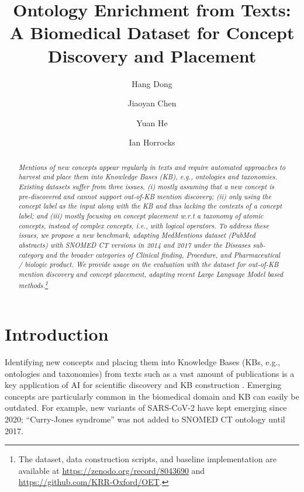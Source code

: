 \documentclass[sigconf]{acmart}
\begin{document}
\title{Ontology Enrichment from Texts: A Biomedical Dataset for Concept Discovery and Placement}

\author{Hang Dong}
	
	\author{Jiaoyan Chen}
	
	\author{Yuan He}
	
	\author{Ian Horrocks}
	
	\renewcommand{\shortauthors}{Dong et al.}
 
\begin{abstract}
\noindent\textit{Mentions of new concepts appear regularly in texts and require automated approaches to harvest and place them into Knowledge Bases (KB), e.g., ontologies and taxonomies. Existing datasets suffer from three issues, (i) mostly assuming that a new concept is pre-discovered and cannot support out-of-KB mention discovery; (ii) only using the concept label as the input along with the KB and thus lacking the contexts of a concept label; and (iii) mostly focusing on concept placement w.r.t a taxonomy of atomic concepts, instead of complex concepts, i.e., with logical operators. To address these issues, we propose a new benchmark, adapting MedMentions dataset (PubMed abstracts) with SNOMED CT versions in 2014 and 2017 under the Diseases sub-category and the broader categories of Clinical finding, Procedure, and Pharmaceutical / biologic product. We provide usage on the evaluation with the dataset for out-of-KB mention discovery and concept placement, adapting recent Large Language Model based methods.\footnote{The dataset, data construction scripts, and baseline implementation are available at \url{https://zenodo.org/record/8043690} and \url{https://github.com/KRR-Oxford/OET}.}}
\end{abstract}
\maketitle

\section{Introduction}
\label{sec:intro}
Identifying new concepts and placing them into Knowledge Bases (KBs, e.g., ontologies and taxonomies) from texts such as a vast amount of publications is a key application of AI for scientific discovery and KB construction \cite{hastings2023ai}. Emerging concepts are particularly common in the biomedical domain and KB can easily be outdated. For example, new variants of SARS-CoV-2 have kept emerging since 2020; ``Curry-Jones syndrome'' was not added to SNOMED CT ontology \cite{donnelly2006snomed} until 2017.
\end{document}
